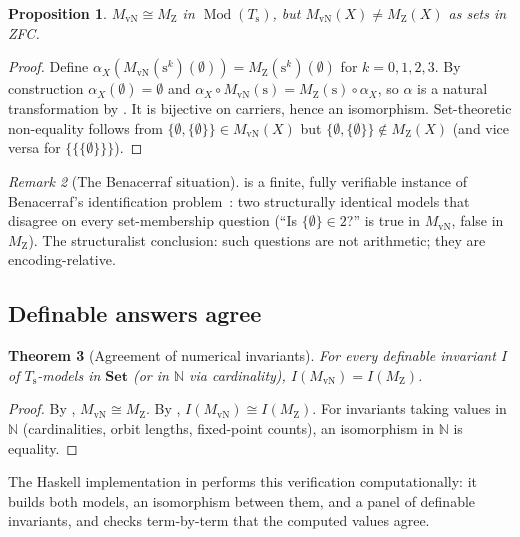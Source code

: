 \documentclass[12pt]{article}
\newtheorem{theorem}{Theorem}[section]
\newtheorem{proposition}[theorem]{Proposition}
\theoremstyle{definition}
\theoremstyle{remark}
\newtheorem{remark}[theorem]{Remark}
\newcommand{\Set}{\mathbf{Set}}
\newcommand{\NN}{\mathbb{N}}
\newcommand{\Mod}[1]{\operatorname{Mod}(#1)}
\newcommand{\iso}{\cong}
\newcommand{\succop}{\mathrm{s}}
\begin{document}
\begin{proposition}\label{prop:vN-Z-iso}
$M_{\mathrm{vN}} \iso M_{\mathrm{Z}}$ in $\Mod{T_\succop}$, but $M_{\mathrm{vN}}(X) \neq M_{\mathrm{Z}}(X)$ as sets in ZFC.
\end{proposition}

\begin{proof}
Define $\alpha_X(M_{\mathrm{vN}}(\succop^k)(\emptyset)) = M_{\mathrm{Z}}(\succop^k)(\emptyset)$ for $k = 0, 1, 2, 3$. By construction $\alpha_X(\emptyset) = \emptyset$ and $\alpha_X \circ M_{\mathrm{vN}}(\succop) = M_{\mathrm{Z}}(\succop) \circ \alpha_X$, so $\alpha$ is a natural transformation by . It is bijective on carriers, hence an isomorphism. Set-theoretic non-equality follows from $\{\emptyset,\{\emptyset\}\} \in M_{\mathrm{vN}}(X)$ but $\{\emptyset,\{\emptyset\}\} \notin M_{\mathrm{Z}}(X)$ (and vice versa for $\{\{\{\emptyset\}\}\}$).
\end{proof}

\begin{remark}[The Benacerraf situation]
 is a finite, fully verifiable instance of Benacerraf's identification problem~\cite{Benacerraf1965}: two structurally identical models that disagree on every set-membership question (``Is $\{\emptyset\} \in 2$?'' is true in $M_{\mathrm{vN}}$, false in $M_{\mathrm{Z}}$). The structuralist conclusion: such questions are not arithmetic; they are encoding-relative.
\end{remark}

\subsection{Definable answers agree}

\begin{theorem}[Agreement of numerical invariants]\label{thm:agreement}
For every definable invariant $I$ of $T_\succop$-models in $\Set$ (or in $\NN$ via cardinality), $I(M_{\mathrm{vN}}) = I(M_{\mathrm{Z}})$.
\end{theorem}

\begin{proof}
By , $M_{\mathrm{vN}} \iso M_{\mathrm{Z}}$. By , $I(M_{\mathrm{vN}}) \iso I(M_{\mathrm{Z}})$. For invariants taking values in $\NN$ (cardinalities, orbit lengths, fixed-point counts), an isomorphism in $\NN$ is equality.
\end{proof}

The Haskell implementation in  performs this verification computationally: it builds both models, an isomorphism between them, and a panel of definable invariants, and checks term-by-term that the computed values agree.
\end{document}
